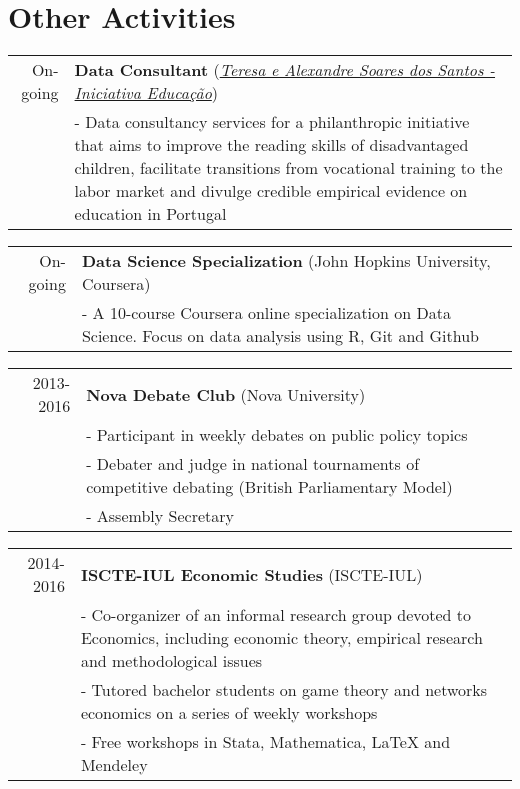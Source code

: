 \documentclass[a4paper,11pt]{article} %
\begin{document}

\section[Other Activities]{\faCubes \hspace{3pt} Other Activities}

\begin{tabular}{r|p{13cm}}
	On-going & \textbf{Data Consultant} (\textit{\href{https://www.iniciativaeducacao.org/en}{Teresa e Alexandre Soares dos Santos - Iniciativa Educação}}) \\
	& - Data consultancy services for a philanthropic initiative that aims to improve the reading skills of disadvantaged children, facilitate transitions from vocational training to the labor market and divulge credible empirical evidence on education in Portugal
\end{tabular}

\begin{tabular}{r|p{13cm}}
	On-going & \textbf{Data Science Specialization} (John Hopkins University, Coursera) \\
	& - A 10-course Coursera online specialization on Data Science. Focus on data analysis using R, Git and Github \\
\end{tabular}

\begin{tabular}{r|p{13cm}}
	2013-2016 & \textbf{Nova Debate Club} (Nova University) \\
	& - Participant in weekly debates on public policy topics \\
	& - Debater and judge in national tournaments of competitive debating (British Parliamentary Model) \\
	& - Assembly Secretary \\
\end{tabular}

\begin{tabular}{r|p{13cm}}
	2014-2016 & \textbf{ISCTE-IUL Economic Studies} (ISCTE-IUL) \\
	& - Co-organizer of an informal research group devoted to Economics, including economic theory, empirical research and methodological issues \\
	& - Tutored bachelor students on game theory and networks economics on a series of weekly workshops \\
	& - Free workshops in Stata, Mathematica, LaTeX and Mendeley \\
\end{tabular}
\end{document}
